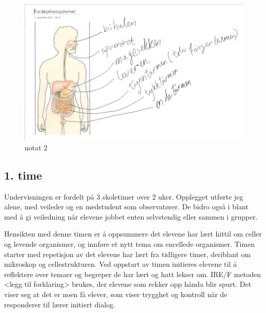 \documentclass[main.tex]{subfiles}
\begin{document}
\begin{figure}[h!]
\includegraphics[scale = 0.6]{../figures/onenote_fordoyelse.png}
\caption{notat 2}
\label{fig:notat2}
\end{figure}

\subsection*{1. time}
Undervisningen er fordelt på 3 skoletimer over 2 uker. Opplegget utførte jeg alene, 
med veileder og en medstudent som observatører. De bidro også i blant med å gi veiledning når elevene jobbet
enten selvstendig eller sammen i grupper.

Hensikten med denne timen er å oppsummere det elevene har lært hittil om celler og 
levende organismer, og innføre et nytt tema om encellede organismer. Timen starter med repetisjon 
av det elevene har lært fra tidligere timer, deriblant om mikroskop og cellestrukturen. Ved oppstart 
av timen initieres elevene til å reflektere over temaer og begreper de har lært og hatt lekser 
om. IRE/F metoden <legg til forklaring> brukes, der elevene som rekker opp hånda blir spurt. Det viser seg at det 
er noen få elever, som viser trygghet og kontroll når de responderer til lærer initiert dialog. 

 
\end{document}
